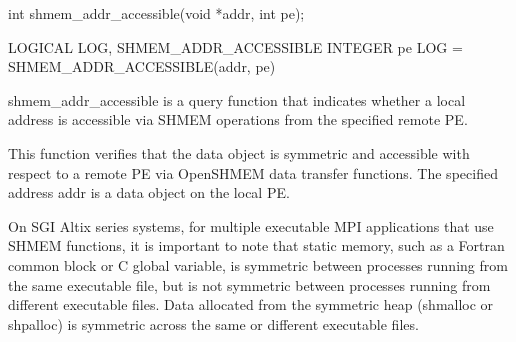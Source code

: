 
\synC
	  int shmem_addr_accessible(void *addr, int pe);

\synF
	  LOGICAL LOG, SHMEM_ADDR_ACCESSIBLE
	  INTEGER pe
	  LOG = SHMEM_ADDR_ACCESSIBLE(addr, pe)


{
       shmem\_addr\_accessible  is  a  query  function  that indicates whether a
       local address is accessible via SHMEM  operations  from	the  specified
       remote \ac{PE}.
       
			 This function verifies that the data object is symmetric and accessible
       with respect to a remote \ac{PE} via OpenSHMEM  data  transfer  functions.   The
       specified address addr is a data object on the local \ac{PE}.

       On  SGI	Altix series systems, for multiple executable MPI applications
       that use SHMEM functions, it is important to note that  static  memory,
       such  as	 a  Fortran  common  block  or C global variable, is symmetric
       between processes running from the same executable  file,  but  is  not
       symmetric  between  processes  running from different executable files.
       Data allocated from  the	 symmetric  heap  (shmalloc  or	 shpalloc)  is
       symmetric across the same or different executable files.
}
{
		\desTB{}
		{
				\cRow{}{}
		}
		\notesB{
		}
}


\eAPI
